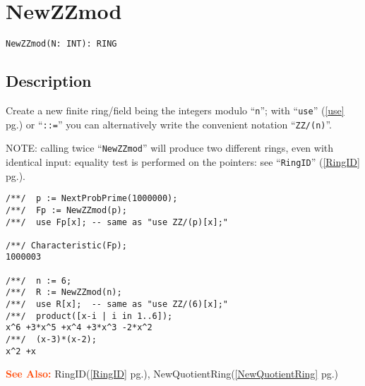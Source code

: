 \documentclass[a4paper]{mybook}
\newenvironment{command}{}{} %
\newcommand\SeeAlso{\par\textcolor{OrangeRed}{\textbf{\large See Also: }}}
\begin{document}
\section{NewZZmod}
\label{NewZZmod}
\begin{command} %


\begin{Verbatim}[label=syntax, rulecolor=\color{MidnightBlue},
frame=single]
NewZZmod(N: INT): RING
\end{Verbatim}


\subsection*{Description}

Create a new finite ring/field being the integers modulo ``\verb&n&'';
with ``\verb&use&'' (\ref{use} pg.\pageref{use}) or ``\verb&::=&'' you can alternatively write
the convenient notation ``\verb&ZZ/(n)&''.
\par 
NOTE: calling twice ``\verb&NewZZmod&'' will produce
two different rings, even with identical input: equality test is
performed on the pointers: see ``\verb&RingID&'' (\ref{RingID} pg.\pageref{RingID}).
\begin{Verbatim}[label=example, rulecolor=\color{PineGreen}, frame=single]
/**/  p := NextProbPrime(1000000);
/**/  Fp := NewZZmod(p);
/**/  use Fp[x]; -- same as "use ZZ/(p)[x];"

/**/ Characteristic(Fp);
1000003

/**/  n := 6;
/**/  R := NewZZmod(n);
/**/  use R[x];  -- same as "use ZZ/(6)[x];"
/**/  product([x-i | i in 1..6]);
x^6 +3*x^5 +x^4 +3*x^3 -2*x^2
/**/  (x-3)*(x-2);
x^2 +x
\end{Verbatim}


\SeeAlso %
  RingID(\ref{RingID} pg.\pageref{RingID}), 
    NewQuotientRing(\ref{NewQuotientRing} pg.\pageref{NewQuotientRing})
\end{command} %
\end{document}
